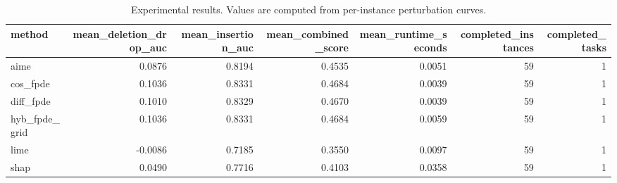 \begin{table}[t]
\caption{Experimental results. Values are computed from per-instance perturbation curves.}
\label{tab:main_results_computed}
\centering
\begin{tabular}{lrrrrrr}
\toprule
method & mean\_deletion\_drop\_auc & mean\_insertion\_auc & mean\_combined\_score & mean\_runtime\_seconds & completed\_instances & completed\_tasks \\
\midrule
aime & 0.0876 & 0.8194 & 0.4535 & 0.0051 & 59 & 1 \\
cos\_fpde & 0.1036 & 0.8331 & 0.4684 & 0.0039 & 59 & 1 \\
diff\_fpde & 0.1010 & 0.8329 & 0.4670 & 0.0039 & 59 & 1 \\
hyb\_fpde\_grid & 0.1036 & 0.8331 & 0.4684 & 0.0059 & 59 & 1 \\
lime & -0.0086 & 0.7185 & 0.3550 & 0.0097 & 59 & 1 \\
shap & 0.0490 & 0.7716 & 0.4103 & 0.0358 & 59 & 1 \\
\bottomrule
\end{tabular}

\end{table}
